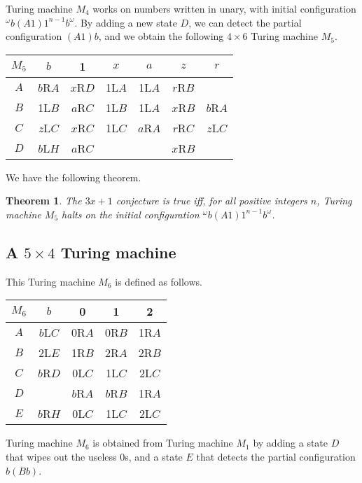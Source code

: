 \documentclass[10pt]{article}
\newtheorem{thm}[prop]{Theorem}
\begin{document}
Turing machine $M_4$ works on numbers written in unary, with initial
configuration ${^\omega}b(A1)1^{n-1}b^\omega$.
By adding a new state $D$, we can detect
the partial configuration $(A1)b$, and we obtain the
following $4 \times 6$ Turing machine $M_5$.

\begin{center}
\begin{tabular}{|c|c|c|c|c|c|c|}
\hline
$M_5$ &  $b$  &    1    & $x$   &    $a$  &   $z$   &  $r$ \\
\hline
$A$ & $b$R$A$ & $x$R$D$ & 1L$A$ &  1L$A$  & $r$R$B$ & \\
\hline
$B$ &  1L$B$  & $a$R$C$ & 1L$B$ &  1L$A$  & $x$R$B$ & $b$R$A$ \\
\hline
$C$ & $z$L$C$ & $x$R$C$ & 1L$C$ & $a$R$A$ & $r$R$C$ & $z$L$C$ \\
\hline
$D$ & $b$L$H$ & $a$R$C$ &       &         & $x$R$B$ &         \\
\hline
\end{tabular}
\end{center}

We have the following theorem.
\begin{thm}
The $3x + 1$ conjecture is true iff, for all positive integers $n$,
Turing machine $M_5$ halts on the initial configuration ${^\omega}b(A1)1^{n-1}b^\omega$.
\end{thm}

\subsection{A $5 \times 4$ Turing machine}
This Turing machine $M_6$ is defined as follows.

\begin{center}
\begin{tabular}{|c|c|c|c|c|}
\hline
$M_6$ &  $b$  &    0    &    1    &   2 \\
\hline
$A$ & $b$L$C$ &  0R$A$  &  0R$B$  & 1R$A$ \\
\hline
$B$ &  2L$E$  &  1R$B$  &  2R$A$  & 2R$B$ \\
\hline
$C$ & $b$R$D$ &  0L$C$  &  1L$C$  & 2L$C$ \\
\hline
$D$ &         & $b$R$A$ & $b$R$B$ & 1R$A$ \\
\hline
$E$ & $b$R$H$ &  0L$C$  &  1L$C$  & 2L$C$ \\
\hline
\end{tabular}
\end{center}

Turing machine $M_6$ is obtained from Turing machine $M_1$ by adding
a state $D$ that wipes out the useless 0s, and a state $E$ that detects
the partial configuration $b(Bb)$.
\end{document}
